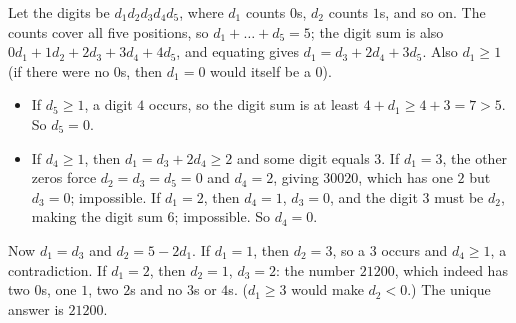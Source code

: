 Let the digits be $d_1d_2d_3d_4d_5$, where $d_1$ counts $0$s, $d_2$ counts $1$s, and so on. The counts cover all five positions, so $d_1+\dots+d_5=5$; the digit sum is also $0d_1+1d_2+2d_3+3d_4+4d_5$, and equating gives $d_1=d_3+2d_4+3d_5$. Also $d_1\ge1$ (if there were no $0$s, then $d_1=0$ would itself be a $0$).
\begin{itemize}
\item If $d_5\ge1$, a digit $4$ occurs, so the digit sum is at least $4+d_1\ge4+3=7>5$. So $d_5=0$.
\item If $d_4\ge1$, then $d_1=d_3+2d_4\ge2$ and some digit equals $3$. If $d_1=3$, the other zeros force $d_2=d_3=d_5=0$ and $d_4=2$, giving $30020$, which has one $2$ but $d_3=0$; impossible. If $d_1=2$, then $d_4=1$, $d_3=0$, and the digit $3$ must be $d_2$, making the digit sum $6$; impossible. So $d_4=0$.
\end{itemize}
Now $d_1=d_3$ and $d_2=5-2d_1$. If $d_1=1$, then $d_2=3$, so a $3$ occurs and $d_4\ge1$, a contradiction. If $d_1=2$, then $d_2=1$, $d_3=2$: the number $21200$, which indeed has two $0$s, one $1$, two $2$s and no $3$s or $4$s. ($d_1\ge3$ would make $d_2<0$.) The unique answer is $\boxed{21200}$.
